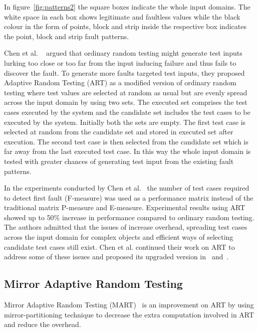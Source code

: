 In figure~\ref{fig:patterns2} the square boxes indicate the whole input domains. The white space in each box shows legitimate and faultless values while the black colour in the form of points, block and strip inside the respective box indicates the point, block and strip fault patterns.

Chen et al. ~\cite{Chen2008} argued that ordinary random testing might generate test inputs lurking too close or too far from the input inducing failure and thus fails to discover the fault. To generate more faults targeted test inputs, they proposed Adaptive Random Testing (ART) as a modified version of ordinary random testing where test values are selected at random as usual but are evenly spread across the input domain by using two sets. The executed set comprises the test cases executed by the system and the candidate set includes the test cases to be executed by the system. Initially both the sets are empty. The first test case is selected at random from the candidate set and stored in executed set after execution. The second test case is then selected from the candidate set which is far away from the last executed test case. In this way the whole input domain is tested with greater chances of generating test input from the existing fault patterns.

In the experiments conducted by Chen et al.~\cite{Chen2008} the number of test cases required to detect first fault (F-measure) was used as a performance matrix instead of the traditional matrix P-measure and E-measure. Experimental results using ART showed up to 50\% increase in performance compared to ordinary random testing. The authors admitted that the issues of increase overhead, spreading test cases across the input domain for complex objects and efficient ways of selecting candidate test cases still exist. Chen et al. continued their work on ART to address some of these issues and proposed its upgraded version in~\cite{chen2009enhanced} and~\cite{Chen2005}. 

\subsection{Mirror Adaptive Random Testing}
Mirror Adaptive Random Testing (MART)~\cite{Chen2003} is an improvement on ART by using mirror-partitioning technique to decrease the extra computation involved in ART and reduce the overhead.

